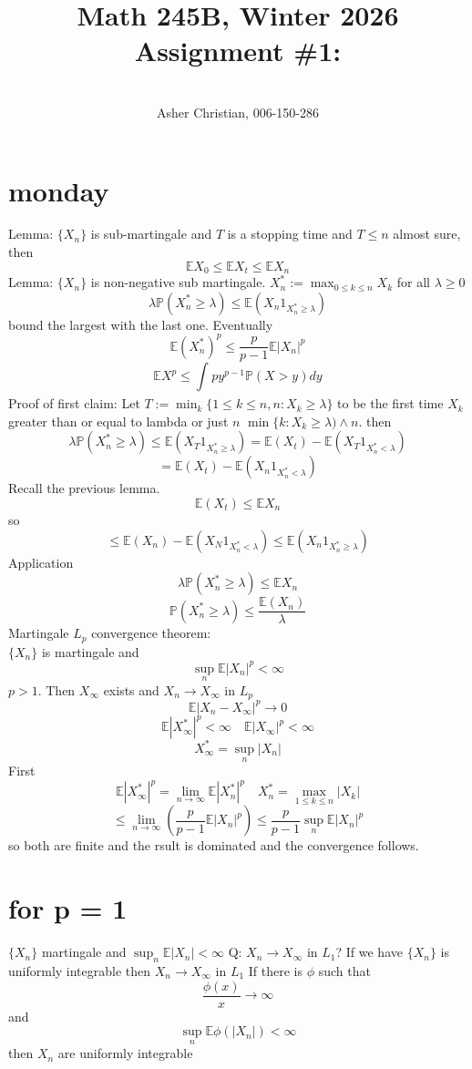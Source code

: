 \documentclass[11pt]{article}
\newcommand{\cnum}{Math 245B}
\newcommand{\ced}{Winter 2026}
\newcommand{\ctitle}[4]{\title{\vspace{-0.5in}\cnum, \ced\\Assignment #1: #2}\author{\vspace{-0.35in}\\#3, #4}}
\begin{document}
\ctitle{\#1}{}{Asher Christian}{006-150-286}
\date{}
\maketitle

\section{monday}
Lemma: $\{X_n\}$ is sub-martingale and  $T$ is a stopping time and  $T \le n$ almost sure,
then
 \[
\mathbb{E}X_0 \le \mathbb{E}X_t \le \mathbb{E}X_n
\] 
Lemma: $\{X_n\}$ is non-negative sub martingale. 
$X_n^{*} := \max_{0 \le k \le n} X_k$
for all $\lambda \ge 0$
\[
    \lambda \mathbb{P}(X_n^{*} \ge \lambda) \le \mathbb{E}(X_n 1_{X_n^{*} \ge \lambda})
\] 
bound the largest with the last one. Eventually
\[
\mathbb{E}(X_n^{*})^{p} \le \frac{p}{p-1} \mathbb{E}|X_n|^{p}
\] 
\[
\mathbb{E}X^{p} \le \int_{}^{}py^{p-1} \mathbb{P} (X > y)dy
\] 
Proof of first claim:
Let $T := \min_k\{1 \le k \le n ,n : X_k \ge \lambda\}$  to be the first time $X_k$ greater than or equal to lambda or just  $n$ 
$\min\{k : X_k \ge \lambda) \wedge n$. then
\[
    \lambda \mathbb{P}(X_n^{*} \ge \lambda) \le \mathbb{E}(X_T 1_{X_n^{*} \ge \lambda}) = \mathbb{E}(X_t) - \mathbb{E}(X_T 1_{X_n^{*} < \lambda})
\] 
\[
    = \mathbb{E}(X_t) - \mathbb{E}(X_n 1_{X_n^{*} < \lambda})
\] 
Recall the previous lemma.
\[
\mathbb{E}(X_t) \le \mathbb{E}X_n
\] 
so
\[
    \le \mathbb{E}(X_n) - \mathbb{E}(X_N 1_{X_n^{*} < \lambda}) \le \mathbb{E}(X_n 1_{X_n^{*} \ge \lambda}) 
\] 
Application
\[
\lambda \mathbb{P}(X_n^{*} \ge \lambda) \le \mathbb{E} X_n
\] 
\[
\mathbb{P}(X_n^{*} \ge \lambda) \le \frac{ \mathbb{E}(X_n)}{\lambda}
\] 
Martingale $L_p$ convergence theorem:\\
$\{X_n\}$ is martingale and
 \[
\sup_n \mathbb{E} |X_n|^{p} < \infty
\] 
$p > 1$.
Then $X_\infty$ exists and $X_n \rightarrow X_\infty$ in $L_p$
\[
\mathbb{E}|X_n - X_\infty|^{p} \rightarrow 0
\] 
\[
    \mathbb{E}|X_{\infty}^{*}|^{p} < \infty \quad \mathbb{E}|X_\infty|^{p} < \infty
\] 
\[
    X_{\infty}^{*} = \sup_n |X_n|
\] 
First
\[
    \mathbb{E}|X_\infty^{*}|^{p} = \lim_{n\to \infty} \mathbb{E}|X_n^{*}|^{p} \quad X_n^{*} = \max_{1 \le k \le n} |X_k|
\] 
\[
\le \lim_{n\to \infty}\left(\frac{p}{p-1} \mathbb{E}|X_n|^{p}\right) \le \frac{p}{p-1} \sup_n \mathbb{E}|X_n|^{p}
\] 
so both are finite and the rsult is dominated and the convergence follows.

\section{for p = 1} 
$\{X_n\}$ martingale and  $ \sup_n \mathbb{E}|X_n| < \infty$
Q: $X_n \rightarrow X_\infty$ in $L_1$?
If we have $\{X_n\}$ is uniformly integrable then  $X_n \rightarrow X_\infty$ in $L_1$ 
If there is $\phi$ such that
\[
    \frac{\phi(x)}{x} \rightarrow \infty
\] and
\[
\sup_n \mathbb{E} \phi(|X_n|) < \infty
\] 
then $X_n$ are uniformly integrable
\end{document}
